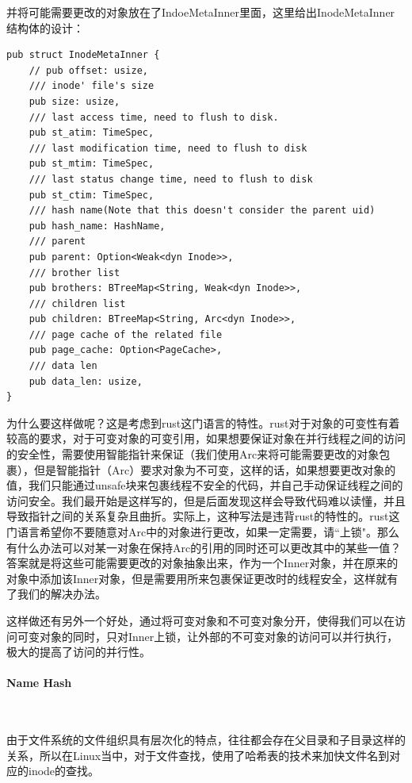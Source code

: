 并将可能需要更改的对象放在了IndoeMetaInner里面，这里给出InodeMetaInner结构体的设计：

\begin{tcolorbox}[
title=\textbf{os/src/fs/inode.rs},
listing only,
breakable
]
\begin{verbatim}
pub struct InodeMetaInner {
    // pub offset: usize,
    /// inode' file's size
    pub size: usize,
    /// last access time, need to flush to disk.
    pub st_atim: TimeSpec,
    /// last modification time, need to flush to disk
    pub st_mtim: TimeSpec,
    /// last status change time, need to flush to disk
    pub st_ctim: TimeSpec,
    /// hash name(Note that this doesn't consider the parent uid)
    pub hash_name: HashName,
    /// parent
    pub parent: Option<Weak<dyn Inode>>,
    /// brother list
    pub brothers: BTreeMap<String, Weak<dyn Inode>>,
    /// children list
    pub children: BTreeMap<String, Arc<dyn Inode>>,
    /// page cache of the related file
    pub page_cache: Option<PageCache>,
    /// data len
    pub data_len: usize,
}
\end{verbatim}
\end{tcolorbox}

为什么要这样做呢？这是考虑到rust这门语言的特性。rust对于对象的可变性有着较高的要求，对于可变对象的可变引用，如果想要保证对象在并行线程之间的访问的安全性，需要使用智能指针来保证（我们使用Arc来将可能需要更改的对象包裹），但是智能指针（Arc）要求对象为不可变，这样的话，如果想要更改对象的值，我们只能通过unsafe块来包裹线程不安全的代码，并自己手动保证线程之间的访问安全。我们最开始是这样写的，但是后面发现这样会导致代码难以读懂，并且导致指针之间的关系复杂且曲折。实际上，这种写法是违背rust的特性的。rust这门语言希望你不要随意对Arc中的对象进行更改，如果一定需要，请``上锁"。那么有什么办法可以对某一对象在保持Arc的引用的同时还可以更改其中的某些一值？答案就是将这些可能需要更改的对象抽象出来，作为一个Inner对象，并在原来的对象中添加该Inner对象，但是需要用所来包裹保证更改时的线程安全，这样就有了我们的解决办法。

这样做还有另外一个好处，通过将可变对象和不可变对象分开，使得我们可以在访问可变对象的同时，只对Inner上锁，让外部的不可变对象的访问可以并行执行，极大的提高了访问的并行性。

\paragraph{Name Hash}~{}

由于文件系统的文件组织具有层次化的特点，往往都会存在父目录和子目录这样的关系，所以在Linux当中，对于文件查找，使用了哈希表的技术来加快文件名到对应的inode的查找。

